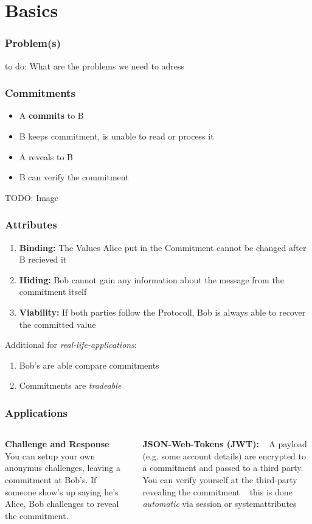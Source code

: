 \section{Basics}

\begin{frame}
	\frametitle{Problem(s)}
	to do: What are the problems we need to adress
\end{frame}

\begin{frame}
	\frametitle{Commitments}
	\begin{itemize}
		\item A \textbf{commits} to B
		\item B keeps commitment, is unable to read or process it
		\item A reveals to B
		\item B can verify the commitment 
	\end{itemize}
TODO: Image
\end{frame}

\begin{frame}
	\frametitle{Attributes}
	\begin{enumerate}
		\item \textbf{Binding:} The Values Alice put in the Commitment cannot be changed after B recieved it 
		\item \textbf{Hiding:} Bob cannot gain any information about the message from the commitment itself
		\item \textbf{Viability:} If both parties follow the Protocoll, Bob is always able to recover the committed value
	\end{enumerate}
	Additional for \textit{real-life-applications}:
	\begin{enumerate}
		\item Bob's are able compare commitments
		\item Commitments are \textit{tradeable}
	\end{enumerate}
\end{frame}

\begin{frame}
	\frametitle{Applications}
	\begin{columns}
		\begin{column}{0.5\textwidth}
			\textbf{Challenge and Response} ~\newline
			You can setup your own anonymus challenges, leaving a commitment at Bob's. If someone show's up saying he's Alice, Bob challenges to reveal the commitment.
		\end{column}
		\begin{column}{0.5\textwidth}
			\textbf{JSON-Web-Tokens (JWT):} ~\newline
			A payload (e.g. some account details) are encrypted to a commitment and passed to a third party. ~\newline 
			You can verify yourself at the third-party revealing the commitment ~\newline 
			this is done \textit{automatic} via session or systemattributes 
		\end{column}
	\end{columns}
\end{frame}